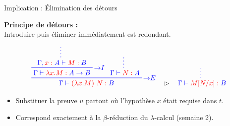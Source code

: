 \documentclass[aspectratio=169]{beamer}
\newcommand{\blue}[1]{\textcolor{blue}{#1}}
\newcommand{\red}[1]{\textcolor{red}{#1}}
\newcommand{\oftype}{\mathrel{\red{:}}}
\begin{document}
\begin{frame}{Implication : Élimination des détours}
  \begin{center}
    \textbf{Principe de détours :}\\
    Introduire puis éliminer immédiatement est redondant.
  \end{center}

  $$
  \blue{
    \prftree[r]{${\to}E$}
    {\prftree[r]{${\to}I$}
      {\prfsummary{\Gamma, \red{x} \oftype A \vdash \red{M} \oftype B}}
    {\Gamma \vdash \red{\lambda x. M} \oftype A \to B}}
    {\prfsummary{\Gamma \vdash \red{N} \oftype A}}
    {\Gamma \vdash \red{(\lambda x.M)\ N} \oftype B}
  }
  \quad \boldsymbol{\rhd} \quad
  \blue{
    \prfsummary{\Gamma \vdash \red{M[N/x]} \oftype B}
  }
  $$

  \vspace{0.1cm}
  \begin{itemize}
    \item Substituer la preuve $u$ partout où l'hypothèse $x$ était requise dans $t$.
    \item Correspond exactement à la $\beta$-réduction du $\lambda$-calcul (semaine 2).
  \end{itemize}

\end{frame}
\end{document}
